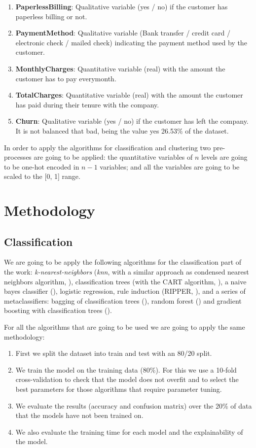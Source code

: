 \documentclass[a4paper,11pt]{article}
\begin{document}
\begin{enumerate}
	\item \textbf{PaperlessBilling}: Qualitative variable (yes / no) if the customer has paperless billing or not.
	\item \textbf{PaymentMethod}: Qualitative variable (Bank transfer / credit card / electronic check / mailed check) indicating the payment method used by the customer.
	\item \textbf{MonthlyCharges}: Quantitative variable (real) with the amount the customer has to pay everymonth.
	\item \textbf{TotalCharges}: Quantitative variable (real) with the amount the customer has paid during their tenure with the company.
	\item \textbf{Churn}: Qualitative variable (yes / no) if the customer has left the company. It is not balanced that bad, being the value yes 26.53\% of the dataset.
\end{enumerate}

In order to apply the algorithms for classification and clustering two pre-processes are going to be applied: the quantitative variables of $n$ levels are going to be one-hot encoded in $n-1$ variables; and all the variables are going to be scaled to the [0, 1] range.

\section{Methodology}

\subsection{Classification}

We are going to be apply the following algorithms for the classification part of the work: \textit{k-nearest-neighbors} (\textit{knn}, with a similar approach as condensed nearest neighbors algorithm, \cite{hart1968}), classification trees (with the CART algorithm, \cite{breiman1984}), a naive bayes classifier (\cite{minsky1961}), logistic regression, rule induction (RIPPER, \cite{cohen1995}), and a series of metaclassifiers: bagging of classification trees (\cite{breiman1996}), random forest (\cite{breiman2001}) and gradient boosting with classification trees (\cite{freund1997}).

For all the algorithms that are going to be used we are going to apply the same methodology:

\begin{enumerate}
	\item First we split the dataset into train and test with an 80/20 split.
	\item We train the model on the training data (80\%). For this we use a 10-fold cross-validation to check that the model does not overfit and to select the best parameters for those algorithms that require parameter tuning.
	\item We evaluate the results (accuracy and confusion matrix) over the 20\% of data that the models have not been trained on.
	\item We also evaluate the training time for each model and the explainability of the model.
\end{enumerate}
\end{document}
